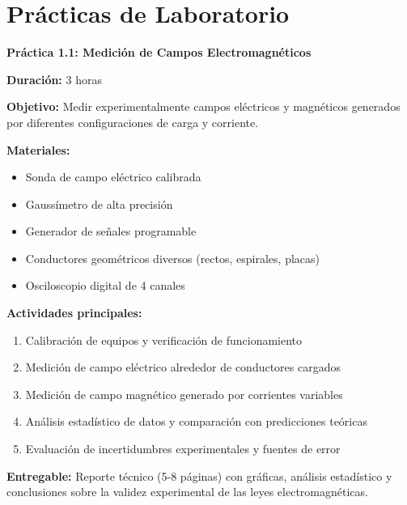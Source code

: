 \documentclass[12pt,a4paper]{book}
\begin{document}
\section{Prácticas de Laboratorio}

\begin{practicabox}
\textbf{Práctica 1.1: Medición de Campos Electromagnéticos}

\textbf{Duración:} 3 horas

\textbf{Objetivo:} Medir experimentalmente campos eléctricos y magnéticos generados por diferentes configuraciones de carga y corriente.

\textbf{Materiales:}
\begin{itemize}
\item Sonda de campo eléctrico calibrada
\item Gaussímetro de alta precisión
\item Generador de señales programable
\item Conductores geométricos diversos (rectos, espirales, placas)
\item Osciloscopio digital de 4 canales
\end{itemize}

\textbf{Actividades principales:}
\begin{enumerate}
\item Calibración de equipos y verificación de funcionamiento
\item Medición de campo eléctrico alrededor de conductores cargados
\item Medición de campo magnético generado por corrientes variables
\item Análisis estadístico de datos y comparación con predicciones teóricas
\item Evaluación de incertidumbres experimentales y fuentes de error
\end{enumerate}

\textbf{Entregable:} Reporte técnico (5-8 páginas) con gráficas, análisis estadístico y conclusiones sobre la validez experimental de las leyes electromagnéticas.
\end{practicabox}
\end{document}
